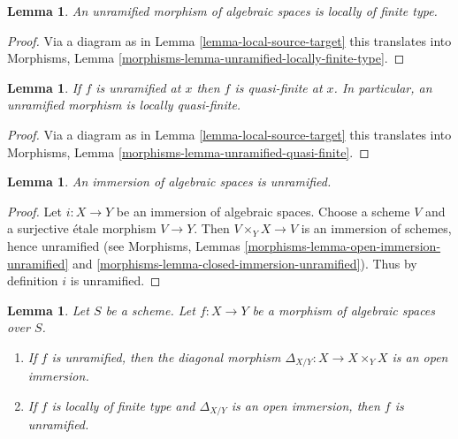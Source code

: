 \documentclass{stacks-project}
\theoremstyle{plain}
\newtheorem{lemma}[subsection]{Lemma}
\theoremstyle{definition}
\theoremstyle{remark}
\numberwithin{equation}{subsection}
\begin{document}
\begin{lemma}
\label{lemma-unramified-locally-finite-type}
An unramified morphism of algebraic spaces is locally of finite type.
\end{lemma}

\begin{proof}
Via a diagram as in
Lemma \ref{lemma-local-source-target}
this translates into
Morphisms, Lemma \ref{morphisms-lemma-unramified-locally-finite-type}.
\end{proof}

\begin{lemma}
\label{lemma-unramified-quasi-finite}
If $f$ is unramified at $x$ then $f$ is quasi-finite at $x$.
In particular, an unramified morphism is locally quasi-finite.
\end{lemma}

\begin{proof}
Via a diagram as in
Lemma \ref{lemma-local-source-target}
this translates into
Morphisms, Lemma \ref{morphisms-lemma-unramified-quasi-finite}.
\end{proof}

\begin{lemma}
\label{lemma-immersion-unramified}
An immersion of algebraic spaces is unramified.
\end{lemma}

\begin{proof}
Let $i : X \to Y$ be an immersion of algebraic spaces. Choose a scheme
$V$ and a surjective \'etale morphism $V \to Y$. Then $V \times_Y X \to V$
is an immersion of schemes, hence unramified (see
Morphisms, Lemmas \ref{morphisms-lemma-open-immersion-unramified} and
\ref{morphisms-lemma-closed-immersion-unramified}).
Thus by definition $i$ is unramified.
\end{proof}

\begin{lemma}
\label{lemma-diagonal-unramified-morphism}
Let $S$ be a scheme.
Let $f : X \to Y$ be a morphism of algebraic spaces over $S$.
\begin{enumerate}
\item If $f$ is unramified, then the diagonal morphism
$\Delta_{X/Y} : X \to X \times_Y X$ is an open immersion.
\item If $f$ is locally of finite type
and $\Delta_{X/Y}$ is an open immersion, then $f$ is unramified.
\end{enumerate}
\end{lemma}
\end{document}
